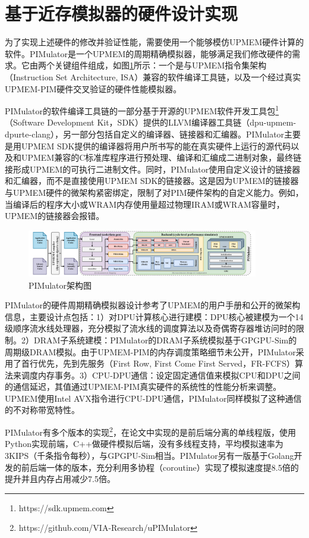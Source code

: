 \section{基于近存模拟器的硬件设计实现}
为了实现上述硬件的修改并验证性能，需要使用一个能够模仿UPMEM硬件计算的软件。PIMulator是一个UPMEM的周期精确模拟器\cite{uPimulator}，能够满足我们修改硬件的需求。它由两个关键组件组成，如图\ref{PIMulator}所示：一个是与UPMEM指令集架构（Instruction Set Architecture, ISA）兼容的软件编译工具链，以及一个经过真实UPMEM-PIM硬件交叉验证的硬件性能模拟器。

PIMulator的软件编译工具链的一部分基于开源的UPMEM软件开发工具包\footnote{https://sdk.upmem.com}（Software Development Kit，SDK）提供的LLVM\cite{LLVM}编译器工具链（dpu-upmem-dpurte-clang），另一部分包括自定义的编译器、链接器和汇编器。PIMulator主要是用UPMEM SDK提供的编译器将用户所书写的能在真实硬件上运行的源代码以及和UPMEM兼容的C标准库程序进行预处理、编译和汇编成二进制对象，最终链接形成UPMEM的可执行二进制文件。同时，PIMulator使用自定义设计的链接器和汇编器，而不是直接使用UPMEM SDK的链接器。这是因为UPMEM的链接器与UPMEM硬件的微架构紧密绑定，限制了对PIM硬件架构的自定义能力。例如，当编译后的程序大小或WRAM内存使用量超过物理IRAM或WRAM容量时，UPMEM的链接器会报错。

\begin{figure}[!htbp]
	\centering
    \includegraphics[width=0.9\textwidth]{figures/PIMulator.pdf}
	\caption{PIMulator架构图}
    \label{PIMulator}
\end{figure}

PIMulator的硬件周期精确模拟器设计参考了UPMEM的用户手册和公开的微架构信息，主要设计点包括：1）对DPU计算核心进行建模：DPU核心被建模为一个14级顺序流水线处理器，充分模拟了流水线的调度算法以及奇偶寄存器堆访问时的限制。2）DRAM子系统建模：PIMulator的DRAM子系统模拟基于GPGPU-Sim的周期级DRAM模拟\cite{GPGPU-Sim}。由于UPMEM-PIM的内存调度策略细节未公开，PIMulator采用了首行优先，先到先服务（First Row, First Come First Served，FR-FCFS）算法来调度内存事务。3）CPU-DPU通信：设定固定通信值来模拟CPU和DPU之间的通信延迟，其值通过UPMEM-PIM真实硬件的系统性的性能分析来调整。UPMEM使用Intel AVX指令进行CPU-DPU通信，PIMulator同样模拟了这种通信的不对称带宽特性。

PIMulator有多个版本的实现\footnote{https://github.com/VIA-Research/uPIMulator}，在论文中实现的是前后端分离的单线程版，使用Python实现前端，C++做硬件模拟后端，没有多线程支持，平均模拟速率为3KIPS（千条指令每秒），与GPGPU-Sim相当。PIMulator另有一版基于Golang开发的前后端一体的版本，充分利用多协程（coroutine）实现了模拟速度提8.5倍的提升并且内存占用减少7.5倍。

